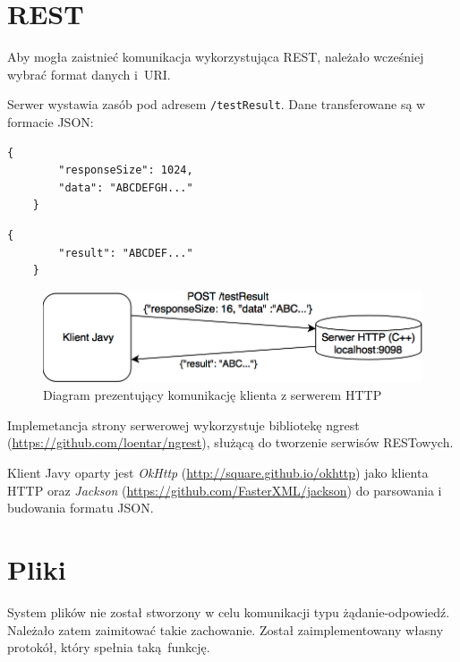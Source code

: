 \section{REST}

Aby mogła zaistnieć komunikacja wykorzystująca REST, należało wcześniej wybrać format danych i~URI.

Serwer wystawia zasób pod adresem \texttt{/testResult}. Dane transferowane są w formacie JSON:
\begin{lstlisting}[caption={Format danych wysyłany przez klienta},captionpos=b]
    {
        "responseSize": 1024,
        "data": "ABCDEFGH..."
    }
\end{lstlisting}

\begin{lstlisting}[caption={Format danych zwracany przez serwer},captionpos=b]
    {
        "result": "ABCDEF..."
    }
\end{lstlisting}

\begin{figure}[h!]
    \centering
    \includegraphics[width=\textwidth,height=\textheight,keepaspectratio]{img/rest_impl_diagram.png}
    \caption{Diagram prezentujący komunikację klienta z serwerem HTTP}
\end{figure}

Implemetancja strony serwerowej wykorzystuje bibliotekę ngrest (\url{https://github.com/loentar/ngrest}), służącą do tworzenie serwisów RESTowych.

Klient Javy oparty jest \textit{OkHttp} (\url{http://square.github.io/okhttp}) jako klienta HTTP oraz \textit{Jackson} \newline (\url{https://github.com/FasterXML/jackson}) do parsowania i budowania formatu JSON.


\section{Pliki}

System plików nie został stworzony w celu komunikacji typu żądanie-odpowiedź. Należało zatem zaimitować takie zachowanie. Został zaimplementowany własny protokół, który spełnia taką funkcję.

